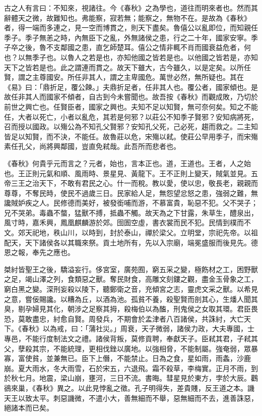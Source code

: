 古之人有言曰：不知來，視諸往。今《春秋》之為學也，道往而明來者也。然而其辭體天之微，故難知也。弗能察，寂若無；能察之，無物不在。是故為《春秋》者，得一端而多連之，見一空而博貫之，則天下盡矣。魯僖公以亂即位，而知親任季子。季子無恙之時，內無臣下之亂，外無諸侯之患，行之二十年，國家安寧。季子卒之後，魯不支鄰國之患，直乞師楚耳。僖公之情非輒不肖而國衰益危者，何也？以無季子也。以魯人之若是也，亦知他國之皆若是也。以他國之皆若是，亦知天下之皆若是也。此之謂連而貫之。故天下雖大，古今雖久，以是定矣。以所任賢，謂之主尊國安。所任非其人，謂之主卑國危。萬世必然，無所疑也。其在《易》曰：「鼎折足，覆公餗。」夫鼎折足者，任非其人也。覆公者，國家傾也。是故任非其人而國家不傾者，自古到今未嘗聞也。故吾按《春秋》而觀成敗，乃切於前世之興亡也。任賢臣者，國家之興也。夫知不足以知賢，無可奈何矣。知之不能任，大者以死亡，小者以亂危，其若是何邪？以莊公不知季子賢邪？安知病將死，召而授以國政。以殤公為不知孔父賢邪？安知孔父死，己必死，趨而救之。二主知皆足以知賢，而不決，不能任。故魯莊以危，宋殤以弒。使莊公早用季子，而宋殤素任孔父，尚將興鄰國，豈直免弒哉。此吾所而悲者也。


《春秋》何貴乎元而言之？元者，始也，言本正也。道，王道也。王者，人之始也。王正則元氣和順、風雨時、景星見、黃龍下。王不正則上變天，賊氣並見。五帝三王之治天下，不敢有君民之心。什一而稅。教以愛，使以忠，敬長老，親親而尊尊，不奪民時，使民不過歲三日。民家給人足，無怨望忿怒之患，強弱之難，無讒賊妒疾之人。民修德而美好，被發銜哺而游，不慕富貴，恥惡不犯。父不哭子；兄不哭弟。毒蟲不螫，猛獸不搏，抵蟲不觸。故天為之下甘露，朱草生，醴泉出，風寸時，嘉禾興，鳳凰麒麟游於郊。囹圄空虛，書衣裳而民不犯。民情到樸而不文。郊天祀地，秩山川，以時到，封於泰山，禪於梁父。立明堂，宗祀先帝。以祖配天，天下諸侯各以其職來祭。貢土地所有，先以入宗廟，端冕盛服而後見先。德恩之報，奉先之應也。


桀紂皆聖王之後，驕溢妄行。侈宮室，廣苑囿，窮五采之變，極飭材之工，困野獸之足，竭山澤之列，食類惡之獸。奪民財食，高雕文刻鏤之觀，盡金玉骨象之工，窮白黑之變。深刑妄殺以陵下，聽鄭衛之音，充傾宮之志，靈虎文采之獸。以希見之意，嘗佞賜讒。以糟為丘，以酒為池。孤貧不養，殺聖賢而剖其心，生燔人聞其臭，剔孕婦見其化，朝涉之足察其拇，殺梅伯以為醢，刑鬼侯之女取其環。君臣畏恐，莫敢盡忠，紂愈自賢。周發兵，不期會於孟津者八百諸侯，共誅紂，大亡天下。《春秋》以為戒，曰：「蒲社災。」周衰，天子微弱，諸侯力政，大夫專國，士專邑，不能行度制法文之禮。諸侯背叛，莫修貢聘，奉獻天子。臣弒其君，子弒其父，孽殺其宗，不能統理，更相伐銼以廣地。以強相脅，不能制屬。強奄弱，眾暴寡，富使貧，並兼無已。臣下上僭，不能禁止。日為之食，星如雨，雨螽，沙鹿崩。夏大雨水，冬大雨雪，石於宋五，六退飛。霜不殺草，李梅實。正月不雨，到於秋七月。地震，梁山崩，壅河，三日不流。書晦。彗星見於東方，孛於大辰。鸛鵒來巢，《春秋》異之。以此見悖亂之徵。孔子明得失，差貴賤，反王道之本。譏天王以致太平。刺惡譏微，不遣小大，善無細而不舉，惡無細而不去，進善誅惡，絕諸本而已矣。



